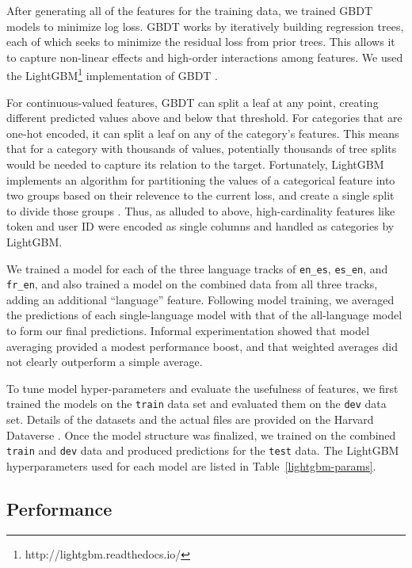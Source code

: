 \documentclass[11pt,a4paper]{article}
\begin{document}
After generating all of the features for the training data, we trained GBDT models to minimize log loss. GBDT works by
iteratively building regression trees, each of which seeks to minimize the
residual loss from prior trees. This allows it to capture non-linear effects
and high-order interactions among features. We used the LightGBM\footnote{http://lightgbm.readthedocs.io/} implementation
of GBDT \cite{ke2017lightgbm}.

For continuous-valued features, GBDT can split a leaf at any point, creating
different predicted values above and below that threshold. For categories that
are one-hot encoded, it can split a leaf on any of the category's features. This
means that for a category with thousands of values, potentially thousands of
tree splits would be needed to capture its relation to the target. Fortunately,
LightGBM implements an algorithm for partitioning the values of a categorical
feature into two groups based on their relevence to the current loss, and create
a single split to divide those groups \cite{fisher1958grouping}. Thus, as
alluded to above, high-cardinality features like token and user ID were encoded as
single columns and handled as categories by LightGBM.

We trained a model for each of the three language tracks of {\tt en\_es}, {\tt es\_en},
and {\tt fr\_en}, and also trained a model on the combined data from
all three tracks, adding an additional ``language'' feature. Following model
training, we averaged the predictions of each single-language model with that of
the all-language model to form our final predictions. Informal experimentation
showed that model averaging provided a modest performance boost, and that
weighted averages did not clearly outperform a simple average.

To tune model hyper-parameters and evaluate the usefulness of features, we first
trained the models on the {\tt train} data set and evaluated them on the {\tt dev}
data set. Details of the datasets and the actual files are provided on the
Harvard Dataverse \cite{8SWHNO_2018}.
Once the model structure was finalized, we trained on the combined
{\tt train} and {\tt dev} data and produced predictions for the {\tt test} data. The
LightGBM hyperparameters used for each model are listed in Table~\ref{lightgbm-params}.



\subsection{Performance}
\end{document}
